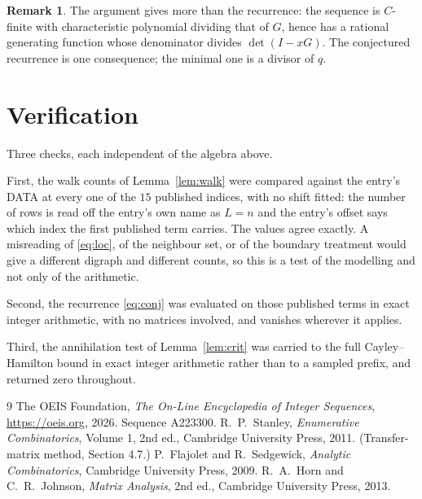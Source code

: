 \documentclass[11pt,a4paper]{article}
\theoremstyle{plain}
\theoremstyle{definition}
\newtheorem{remark}[theorem]{Remark}
\begin{document}
\begin{remark}
The argument gives more than the recurrence: the sequence is $C$-finite with characteristic
polynomial dividing that of $G$, hence has a rational generating function whose denominator
divides $\det(I-xG)$. The conjectured recurrence is one consequence; the minimal one is a
divisor of $q$.
\end{remark}

\section{Verification}

Three checks, each independent of the algebra above.

First, the walk counts of Lemma~\ref{lem:walk} were compared against the entry's DATA at
every one of the $15$ published indices, with no shift fitted: the number of rows is
read off the entry's own name as $L=n$ and the entry's offset says which index the first
published term carries. The values agree exactly. A misreading of \eqref{eq:loc}, of the
neighbour set, or of the boundary treatment would give a different digraph and different
counts, so this is a test of the modelling and not only of the arithmetic.

Second, the recurrence \eqref{eq:conj} was evaluated on those published terms in exact
integer arithmetic, with no matrices involved, and vanishes wherever it applies.

Third, the annihilation test of Lemma~\ref{lem:crit} was carried to the full
Cayley--Hamilton bound in exact integer arithmetic rather than to a sampled prefix, and
returned zero throughout.

\begin{thebibliography}{9}
 The OEIS Foundation, \emph{The On-Line Encyclopedia of Integer
Sequences}, \url{https://oeis.org}, 2026. Sequence A223300.
 R.~P.~Stanley, \emph{Enumerative Combinatorics}, Volume 1, 2nd ed.,
Cambridge University Press, 2011. (Transfer-matrix method, Section 4.7.)
 P.~Flajolet and R.~Sedgewick, \emph{Analytic Combinatorics}, Cambridge
University Press, 2009.
 R.~A.~Horn and C.~R.~Johnson, \emph{Matrix Analysis}, 2nd ed., Cambridge
University Press, 2013.
\end{thebibliography}
\end{document}
